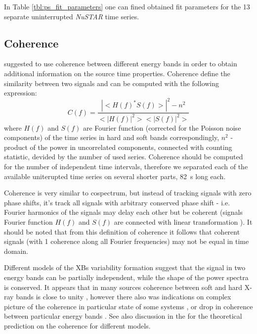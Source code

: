 \documentclass[a4paper,fleqn,usenatbib]{mnras}
\begin{document}
In Table \ref{tbl:ps_fit_parameters} one can fined obtained fit parameters for the 13 separate uninterrupted {\it NuSTAR} time series.

\subsection{Coherence}

\citep{1997ApJ...474L..43V} suggested to use coherence between different energy bands in order to obtain additional information on the source time properties. 
Coherence define the similarity between two signals and can be computed with the following expression:
\begin{equation}
    C(f) = \frac{|<H(f)^*S(f)>|^2 - n^2}{<|H(f)|^2><|S(f)|^2>}
    \label{eq:nowak_coh}
\end{equation}
where $H(f)$ and $S(f)$ are Fourier function (corrected for the Poisson noise components) of the time series in hard and soft bands correspondingly, 
$n^2$ - product of the power in uncorrelated components, connected with counting statistic, devided by the number of used series. 
Coherence should be computed for the number of independent time intervals, therefore we separated each of the available uniterupted time series on several shorter parts, 82~s long each.  


Coherence is very similar to cospectrum, but instead of tracking signals with zero phase shifts, it's track all signals with arbitrary conserved phase shift - i.e. Fourier harmonics of the signals may delay each other but be coherent (signals Fourier function $H(f)$ and $S(f)$ are connected with linear transformation \citep{1997ApJ...474L..43V}).
It should be noted that from this definition of coherence it follows that coherent signals (with 1 coherence along all Fourier frequencies) may not be equal in time domain. 

Different models of the XBs variability formation suggest that the signal in two energy bands can be partially independent, while the shape of the power spectra is conserved.
It appears that in many sources coherence between soft and hard X-ray bands is close to unity \citep{1999ApJ...517..355N, 1999ApJ...514..939W}, however there also was indications on complex picture of the coherence in particular state of some systems \citep{2003ApJ...584L..23J}, or drop in coherence between particular energy bands \citep[see, GX 339--4 result in][]{1997ApJ...474L..43V}.
See also discussion in the \citep{1997ApJ...474L..43V} for the theoretical prediction on the coherence for different models.
\end{document}
